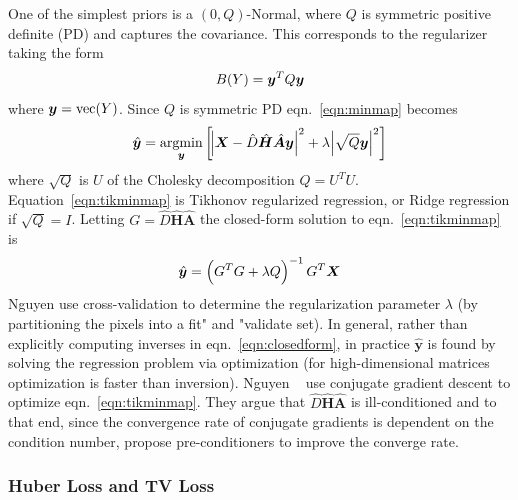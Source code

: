One of the simplest priors is a \((0, Q)\)-Normal, where \(Q\) is symmetric positive definite (PD) and captures the covariance.
%
This corresponds to the regularizer taking the form
\begin{equation}
	B(Y) = \bm{y} ^T Q \bm{y}
\end{equation}
where \(\bm{y} = \text{vec}(Y)\).
%
Since \(Q\) is symmetric PD eqn.~\eqref{eqn:minmap} becomes
\begin{equation}
	\hat{\bm{y}} = \underset{\bm{y}}{\text{argmin}}\left[ \abs{ \bm{X} - \hat{D} \hat{\bm{H}} \hat{\bm{A}} \bm{y} }^2 +\lambda \abs{ \sqrt{Q}\bm{y} }^2 \right]
	\label{eqn:tikminmap}
\end{equation}
where \(\sqrt{Q}\) is \(U\) of the Cholesky decomposition \(Q = U^T U\).
%
Equation~\ref{eqn:tikminmap} is Tikhonov regularized regression, or Ridge regression if \(\sqrt{Q} = I\).
%
Letting \(G = \hat{D} \hat{\bm{H}} \hat{\bm{A}}\) the closed-form solution to eqn.~\eqref{eqn:tikminmap} is
\begin{equation}
	\hat{\by} = \left( G^T G + \lambda Q \right)^{-1} G^T\bX
	\label{eqn:closedform}
\end{equation}
Nguyen \etal\cite{milanfar2001} use cross-validation to determine the regularization parameter \(\lambda\) (by partitioning the pixels into a fit" and "validate set).
%
In general, rather than explicitly computing inverses in eqn.~\eqref{eqn:closedform}, in practice \(\hat{\bm{y}}\) is found by solving the regression problem via optimization (for high-dimensional matrices optimization is faster than inversion).
%
Nguyen \etal~ use conjugate gradient descent to optimize eqn.~\eqref{eqn:tikminmap}.
%
They argue that \(\hat{D} \hat{\bm{H}} \hat{\bm{A}}\) is ill-conditioned and to that end, since the convergence rate of conjugate gradients is dependent on the condition number\cite{vanderSluis1986}, propose pre-conditioners to improve the converge rate.

\subsubsection{Huber Loss and TV Loss}

